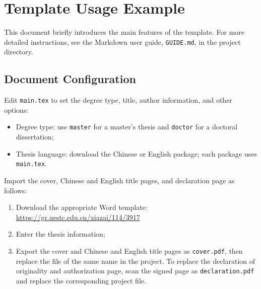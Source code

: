 \chapter{Template Usage Example}

This document briefly introduces the main features of the template. For more detailed instructions,
see the Markdown user guide, \mbox{\texttt{GUIDE.md}}, in the project directory.

\section{Document Configuration}

Edit \texttt{main.tex} to set the degree type, title, author information, and other options:

\begin{itemize}
    \item Degree type: use \texttt{master} for a master's thesis and \texttt{doctor} for a doctoral dissertation;
    \item Thesis language: download the Chinese or English package; each package uses \texttt{main.tex}.
\end{itemize}

Import the cover, Chinese and English title pages, and declaration page as follows:

\begin{enumerate}
    \item Download the appropriate Word template:
        \href{https://gr.uestc.edu.cn/xiazai/114/3917}{https://gr.uestc.edu.cn/xiazai/114/3917}
    \item Enter the thesis information;
    \item Export the cover and Chinese and English title pages as \texttt{cover.pdf}, then replace the file
        of the same name in the project. To replace the declaration of originality and authorization page,
        scan the signed page as \texttt{declaration.pdf} and replace the corresponding project file.
\end{enumerate}

